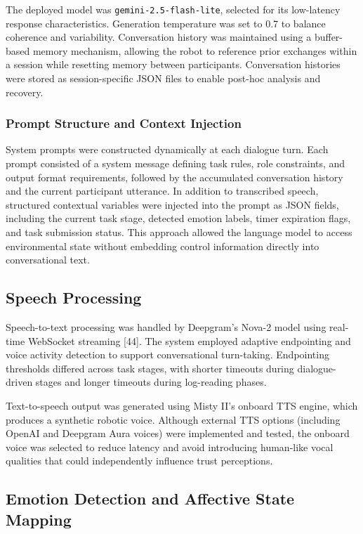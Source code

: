 \documentclass[
  letterpaper,
  DIV=11,
  numbers=noendperiod]{scrartcl}
\begin{document}
The deployed model was \texttt{gemini-2.5-flash-lite}, selected for its
low-latency response characteristics. Generation temperature was set to
0.7 to balance coherence and variability. Conversation history was
maintained using a buffer-based memory mechanism, allowing the robot to
reference prior exchanges within a session while resetting memory
between participants. Conversation histories were stored as
session-specific JSON files to enable post-hoc analysis and recovery.

\subsubsection{Prompt Structure and Context
Injection}\label{prompt-structure-and-context-injection}

System prompts were constructed dynamically at each dialogue turn. Each
prompt consisted of a system message defining task rules, role
constraints, and output format requirements, followed by the accumulated
conversation history and the current participant utterance. In addition
to transcribed speech, structured contextual variables were injected
into the prompt as JSON fields, including the current task stage,
detected emotion labels, timer expiration flags, and task submission
status. This approach allowed the language model to access environmental
state without embedding control information directly into conversational
text.

\subsection{Speech Processing}\label{speech-processing}

Speech-to-text processing was handled by Deepgram's Nova-2 model using
real-time WebSocket streaming {[}44{]}. The system employed adaptive
endpointing and voice activity detection to support conversational
turn-taking. Endpointing thresholds differed across task stages, with
shorter timeouts during dialogue-driven stages and longer timeouts
during log-reading phases.

Text-to-speech output was generated using Misty II's onboard TTS engine,
which produces a synthetic robotic voice. Although external TTS options
(including OpenAI and Deepgram Aura voices) were implemented and tested,
the onboard voice was selected to reduce latency and avoid introducing
human-like vocal qualities that could independently influence trust
perceptions.

\subsection{Emotion Detection and Affective State
Mapping}\label{emotion-detection-and-affective-state-mapping}
\end{document}
